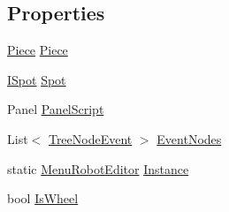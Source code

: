 \subsection*{Properties}
\begin{DoxyCompactItemize}
\item 
\hyperlink{classgearit_1_1src_1_1robot_1_1_piece}{Piece} \hyperlink{classgearit_1_1src_1_1_g_u_i_1_1_menu_robot_editor_abbd044d173971e9110df39ad1c5fb6fc}{Piece}
\item 
\hyperlink{interfacegearit_1_1src_1_1robot_1_1_i_spot}{I\+Spot} \hyperlink{classgearit_1_1src_1_1_g_u_i_1_1_menu_robot_editor_af6b5827eb1e2b200dea135df84e7053a}{Spot}
\item 
Panel \hyperlink{classgearit_1_1src_1_1_g_u_i_1_1_menu_robot_editor_ab809a64f84579ba9a7504963d9884459}{Panel\+Script}
\item 
List$<$ \hyperlink{classgearit_1_1src_1_1_g_u_i_1_1_tree_node_event}{Tree\+Node\+Event} $>$ \hyperlink{classgearit_1_1src_1_1_g_u_i_1_1_menu_robot_editor_ad13f3c32d16d1a8e42cc0a858a21dbc5}{Event\+Nodes}
\item 
static \hyperlink{classgearit_1_1src_1_1_g_u_i_1_1_menu_robot_editor}{Menu\+Robot\+Editor} \hyperlink{classgearit_1_1src_1_1_g_u_i_1_1_menu_robot_editor_a6c62e3d2a7a21edc84617d816b106613}{Instance}
\item 
bool \hyperlink{classgearit_1_1src_1_1_g_u_i_1_1_menu_robot_editor_a6cc59d6cf6e8afed139f95e9356557b8}{Is\+Wheel}
\end{DoxyCompactItemize}


